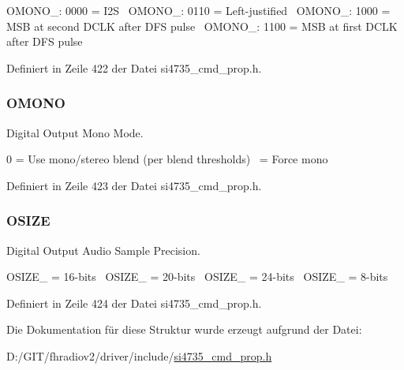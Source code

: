 O\+M\+O\+N\+O\+\_\+: 0000 = I2\+S~\newline
O\+M\+O\+N\+O\+\_\+: 0110 = Left-\/justified~\newline
O\+M\+O\+N\+O\+\_\+: 1000 = M\+S\+B at second D\+C\+L\+K after D\+F\+S pulse~\newline
O\+M\+O\+N\+O\+\_\+: 1100 = M\+S\+B at first D\+C\+L\+K after D\+F\+S pulse 

Definiert in Zeile 422 der Datei si4735\+\_\+cmd\+\_\+prop.\+h.

\hypertarget{uniondout__format_a93761dc84dd5d349d8133cbd92a5f9b5}{}
\subsubsection[{O\+M\+O\+N\+O}]{\setlength{\rightskip}{0pt plus 5cm}O\+M\+O\+N\+O}\label{uniondout__format_a93761dc84dd5d349d8133cbd92a5f9b5}


Digital Output Mono Mode. 

0 = Use mono/stereo blend (per blend thresholds)~ = Force mono 

Definiert in Zeile 423 der Datei si4735\+\_\+cmd\+\_\+prop.\+h.

\hypertarget{uniondout__format_a7b03eaf984aaf8efadcedcfabd0df922}{}
\subsubsection[{O\+S\+I\+Z\+E}]{\setlength{\rightskip}{0pt plus 5cm}O\+S\+I\+Z\+E}\label{uniondout__format_a7b03eaf984aaf8efadcedcfabd0df922}


Digital Output Audio Sample Precision. 

O\+S\+I\+Z\+E\+\_ = 16-\/bits~\newline
O\+S\+I\+Z\+E\+\_ = 20-\/bits~\newline
O\+S\+I\+Z\+E\+\_ = 24-\/bits~\newline
O\+S\+I\+Z\+E\+\_ = 8-\/bits 

Definiert in Zeile 424 der Datei si4735\+\_\+cmd\+\_\+prop.\+h.



Die Dokumentation für diese Struktur wurde erzeugt aufgrund der Datei\+:\begin{DoxyCompactItemize}
\item 
D\+:/\+G\+I\+T/fhradiov2/driver/include/\hyperlink{si4735__cmd__prop_8h}{si4735\+\_\+cmd\+\_\+prop.\+h}\end{DoxyCompactItemize}
